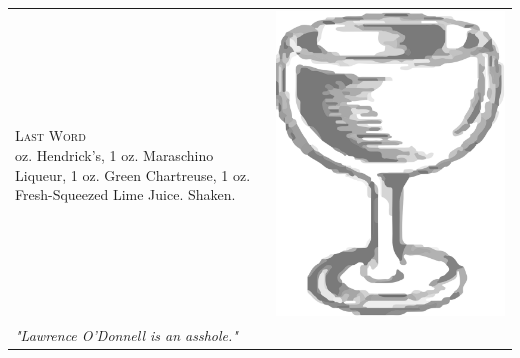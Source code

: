 \documentclass{article}
\begin{document}
\begin{tabular}{*{2}{m{}}}
{\raggedleft\huge\textsc{Last Word}\\*}
\raggedleft 1 oz. Hendrick's, 1 oz. Maraschino Liqueur, 1 oz. Green Chartreuse, 1 oz. Fresh-Squeezed Lime Juice. Shaken. & \includegraphics{coupe.png}\\
\raggedleft\small\textit{"Lawrence O'Donnell is an asshole."}
\end{tabular}
\end{document}
